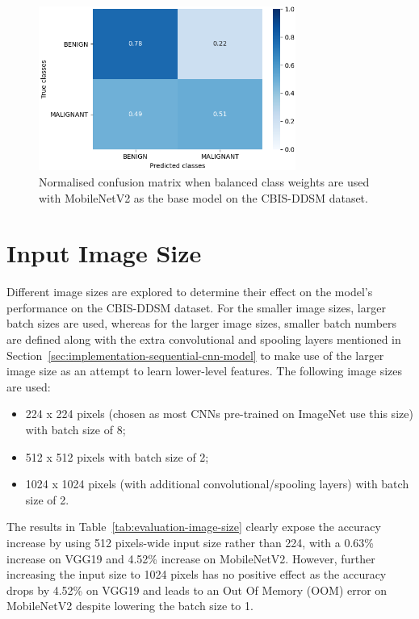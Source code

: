 \begin{figure}[h]
\centerline{\includegraphics[width=0.75\textwidth]{figures/evaluation/class_weights_experiment/balanced.png}}
\caption{\label{fig:evaluation-class_weights_experiment-balanced}Normalised confusion matrix when balanced class weights are used with MobileNetV2 as the base model on the CBIS-DDSM dataset.}
\end{figure}


\section{Input Image Size}

Different image sizes are explored to determine their effect on the model's performance on the CBIS-DDSM dataset. For the smaller image sizes, larger batch sizes are used, whereas for the larger image sizes, smaller batch numbers are defined along with the extra convolutional and spooling layers mentioned in Section~\ref{sec:implementation-sequential-cnn-model} to make use of the larger image size as an attempt to learn lower-level features. The following image sizes are used:
\begin{itemize}
    \item 224 x 224 pixels (chosen as most CNNs pre-trained on ImageNet use this size) with batch size of 8;
    \item 512 x 512 pixels with batch size of 2;
    \item 1024 x 1024 pixels (with additional convolutional/spooling layers) with batch size of 2.
\end{itemize}



The results in Table~\ref{tab:evaluation-image-size} clearly expose the accuracy increase by using 512 pixels-wide input size rather than 224, with a 0.63\% increase on VGG19 and 4.52\% increase on MobileNetV2. However, further increasing the input size to 1024 pixels has no positive effect as the accuracy drops by 4.52\% on VGG19 and leads to an Out Of Memory (OOM) error on MobileNetV2 despite lowering the batch size to 1.\\

